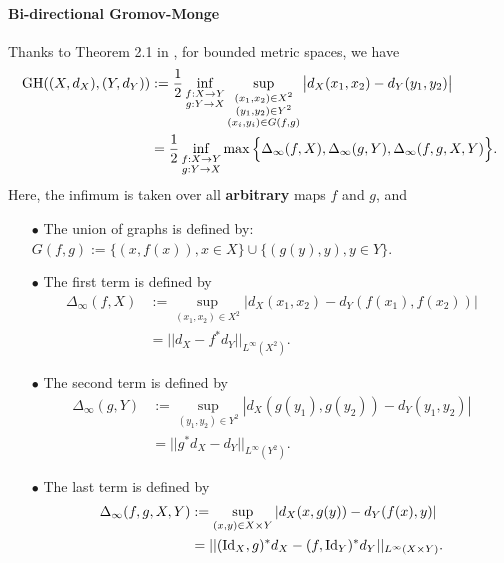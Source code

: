 \paragraph{Bi-directional Gromov-Monge}
Thanks to Theorem 2.1 in \citep{Kalton99}, for bounded metric spaces, we have
\begin{align} \label{kalton_form}
  \text{GH}((X,d_X), (Y,d_Y)) &:= \frac{1}{2} \inf_{\substack{f: X \to Y \\ g: Y \to X}}
  \sup_{\substack{(x_1, x_2) \in X^2 \\ (y_1, y_2) \in Y^2 \\
  (x_i, y_i) \in G(f,g)}} \big| d_X(x_1, x_2) - d_Y(y_1, y_2) \big| \\
  &= \frac{1}{2} \inf_{\substack{f: X \to Y \\ g: Y \to X}}
  \max \Big\{ \Delta_{\infty}(f, X), \Delta_{\infty}(g, Y), \Delta_{\infty}(f,g, X, Y) \Big\}.
\end{align}
Here, the infimum is taken over all \textbf{arbitrary} maps $f$ and $g$, and
\begin{itemize}
  \item[$\bullet$] The union of graphs is defined by:
  $G(f,g) := \{(x, f(x)), x \in X\} \cup \{(g(y), y), y \in Y \}$.

  \item[$\bullet$] The first term is defined by
  \begin{align}
    \Delta_{\infty}(f, X) &:=
    \sup_{(x_1, x_2) \in X^2} \left| d_X(x_1, x_2) - d_Y(f(x_1), f(x_2)) \right| \\
    &= || d_X - f^* d_Y ||_{L^{\infty}(X^2)}.
  \end{align}

  \item[$\bullet$] The second term is defined by
  \begin{align}
    \Delta_{\infty}(g, Y) &:= \sup_{(y_1, y_2) \in Y^2}
    \left| d_X(g(y_1), g(y_2)) - d_Y(y_1, y_2) \right| \\
    &= || g^*d_X - d_Y ||_{L^{\infty}(Y^2)}.
  \end{align}

  \item[$\bullet$] The last term is defined by
  \begin{align}
    \Delta_{\infty}(f,g, X, Y)
    &:= \sup_{(x, y) \in X \times Y} \left| d_X(x, g(y)) - d_Y(f(x),y) \right| \\
    &= || (\text{Id}_X, g)^*d_X - (f, \text{Id}_Y)^*d_Y ||_{L^{\infty}(X \times Y)}.
  \end{align}
\end{itemize}
